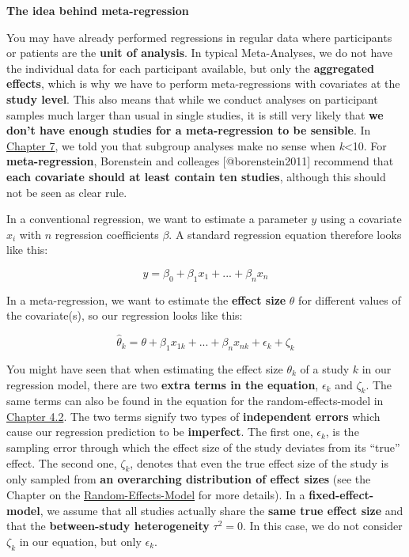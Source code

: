 \documentclass[]{book}
\theoremstyle{definition}
\theoremstyle{definition}
\theoremstyle{definition}
\theoremstyle{remark}
\begin{document}
\begin{rmdinfo}
\textbf{The idea behind meta-regression}

You may have already performed regressions in regular data where
participants or patients are the \textbf{unit of analysis}. In typical
Meta-Analyses, we do not have the individual data for each participant
available, but only the \textbf{aggregated effects}, which is why we
have to perform meta-regressions with covariates at the \textbf{study
level}. This also means that while we conduct analyses on participant
samples much larger than usual in single studies, it is still very
likely that \textbf{we don't have enough studies for a meta-regression
to be sensible}. In \protect\hyperlink{subgroup}{Chapter 7}, we told you
that subgroup analyses make no sense when \emph{k}\textless{}10. For
\textbf{meta-regression}, Borenstein and colleages {[}@borenstein2011{]}
recommend that \textbf{each covariate should at least contain ten
studies}, although this should not be seen as clear rule.

In a conventional regression, we want to estimate a parameter \(y\)
using a covariate \(x_i\) with \(n\) regression coefficients \(\beta\).
A standard regression equation therefore looks like this:

\[y=\beta_0 + \beta_1x_1 + ...+\beta_nx_n\]

In a meta-regression, we want to estimate the \textbf{effect size}
\(\theta\) for different values of the covariate(s), so our regression
looks like this:

\[\hat \theta_k = \theta + \beta_1x_{1k} + ... + \beta_nx_{nk} + \epsilon_k + \zeta_k\]

You might have seen that when estimating the effect size \(\theta_k\) of
a study \(k\) in our regression model, there are two \textbf{extra terms
in the equation}, \(\epsilon_k\) and \(\zeta_k\). The same terms can
also be found in the equation for the random-effects-model in
\protect\hyperlink{random}{Chapter 4.2}. The two terms signify two types
of \textbf{independent errors} which cause our regression prediction to
be \textbf{imperfect}. The first one, \(\epsilon_k\), is the sampling
error through which the effect size of the study deviates from its
``true'' effect. The second one, \(\zeta_k\), denotes that even the true
effect size of the study is only sampled from \textbf{an overarching
distribution of effect sizes} (see the Chapter on the
\protect\hyperlink{random}{Random-Effects-Model} for more details). In a
\textbf{fixed-effect-model}, we assume that all studies actually share
the \textbf{same true effect size} and that the \textbf{between-study
heterogeneity} \(\tau^2 = 0\). In this case, we do not consider
\(\zeta_k\) in our equation, but only \(\epsilon_k\).


\end{rmdinfo}
\end{document}
